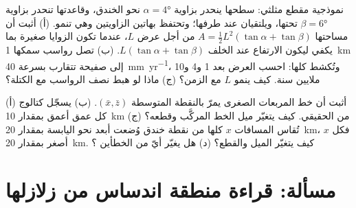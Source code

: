 \begin{exercise}[$\star\star\star$]\label{exo:b1:active-margins:11}
 نموذجية مقطع مثلثي: سطحها ينحدر بزاوية $\alpha = \ang{4}$ نحو الخندق، وقاعدتها تنحدر بزاوية $\beta = \ang{6}$ تحتها، ويلتقيان عند طرفها؛ وتحتفظ بهاتين الزاويتين وهي تنمو. (أ) أثبت أن مساحتها $A = \frac12 L^2(\tan\alpha + \tan\beta)$ من أجل عرض $L$، عندما تكون الزوايا صغيرة بما يكفي ليكون الارتفاع عند الخلف $L(\tan\alpha + \tan\beta)$. (ب) تصل رواسب سمكها \qty{1}{km} إلى صفيحة تتقارب بسرعة \qty{40}{mm.yr^{-1}}، وتُكشط كلها: احسب العرض بعد 1 و\num{4} و\num{10} ملايين سنة. كيف ينمو $L$ مع الزمن؟ (ج) ماذا لو هبط نصف الرواسب مع الكتلة؟
\end{exercise}

\begin{exercise}[$\star\star\star$]\label{exo:b1:active-margins:12}
(أ) أثبت أن خط المربعات الصغرى يمرّ بالنقطة المتوسطة $(\bar x, \bar z)$. (ب) يسجّل كتالوج كل عمق أعمق بمقدار \qty{10}{km} من الحقيقي. كيف يتغيّر ميل الخط المركَّب وقطعه؟ (ج) تُقاس المسافات $x$ كلها من نقطة خندق وُضعت أبعد نحو اليابسة بمقدار \qty{20}{km}، فكل $x$ أصغر بمقدار \qty{20}{km}. كيف يتغيّر الميل والقطع؟ (د) هل يغيّر أيّ من الخطأين ؟
\end{exercise}

\section{مسألة: قراءة منطقة اندساس من زلازلها}

